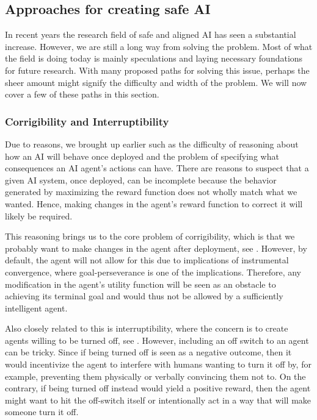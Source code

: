 \documentclass[12pt,A4]{report}
\theoremstyle{definition}
\begin{document}
\subsection{Approaches for creating safe AI}
In recent years the research field of safe and aligned AI has seen a substantial increase. However, we are still a long way from solving the problem. Most of what the field is doing today is mainly speculations and laying necessary foundations for future research. With many proposed paths for solving this issue, perhaps the sheer amount might signify the difficulty and width of the problem. We will now cover a few of these paths in this section.


\subsubsection{Corrigibility and Interruptibility }
Due to reasons, we brought up earlier such as the difficulty of reasoning about how an AI will behave once deployed and the problem of specifying what consequences an AI agent's actions can have. There are reasons to suspect that a given AI system, once deployed, can be incomplete because the behavior generated by maximizing the reward function does not wholly match what we wanted. Hence, making changes in the agent's reward function to correct it will likely be required.  

This reasoning brings us to the core problem of corrigibility, which is that we probably want to make changes in the agent after deployment, see \citet{Corrigibility}. However, by default, the agent will not allow for this due to implications of instrumental convergence, where goal-perseverance is one of the implications. Therefore, any modification in the agent's utility function will be seen as an obstacle to achieving its terminal goal and would thus not be allowed by a sufficiently intelligent agent. 

Also closely related to this is interruptibility, where the concern is to create agents willing to be turned off, see \citet{Interruptible}. However, including an off switch to an agent can be tricky. Since if being turned off is seen as a negative outcome, then it would incentivize the agent to interfere with humans wanting to turn it off by, for example, preventing them physically or verbally convincing them not to. On the contrary, if being turned off instead would yield a positive reward, then the agent might want to hit the off-switch itself or intentionally act in a way that will make someone turn it off. 
\end{document}
